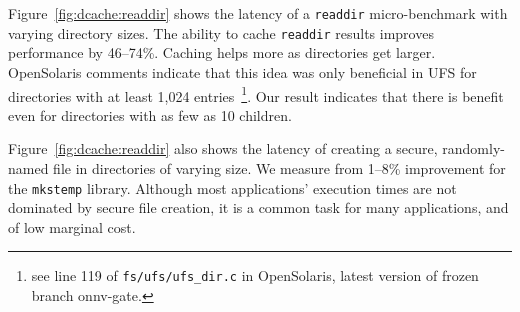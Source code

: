 Figure~\ref{fig:dcache:readdir} shows the latency 
of a {\tt readdir} micro-benchmark with varying directory sizes.
The ability to cache {\tt readdir} results improves performance by 46--74\%.
Caching helps more as directories get larger.
OpenSolaris comments indicate that this idea was only beneficial 
in UFS for directories with at least 1,024 entries~\footnote{see line 119 of {\tt fs/ufs/ufs\_dir.c} in OpenSolaris, latest version of frozen branch onnv-gate.}.
Our result indicates that there is benefit even for directories with as few as 10 children.

Figure~\ref{fig:dcache:readdir} also shows 
the latency of creating a secure, randomly-named file in directories of varying size.
We measure from 1--8\% improvement for the {\tt mkstemp} library.
Although most applications' execution times are not dominated by secure file creation,
it is a common task for many applications, and of low marginal cost.



